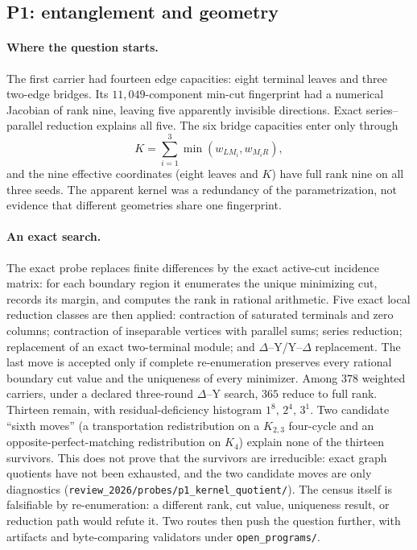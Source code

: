 \documentclass[11pt]{article}
\theoremstyle{definition}
\begin{document}
\subsection{P1: entanglement and geometry}\label{the-entanglement-geometry-question-open-program}

\paragraph{Where the question starts.} The first carrier had fourteen edge capacities: eight terminal leaves and three
two-edge bridges. Its \(11{,}049\)-component min-cut fingerprint had a numerical Jacobian of rank nine, leaving five
apparently invisible directions. Exact series--parallel reduction explains all five. The six bridge capacities enter
only through
\[
K=\sum_{i=1}^{3}\min(w_{LM_i},w_{M_iR}),
\]
and the nine effective coordinates (eight leaves and \(K\)) have full rank nine on all three seeds. The apparent kernel
was a redundancy of the parametrization, not evidence that different geometries share one fingerprint.

\paragraph{An exact search.} The exact probe replaces finite differences by the exact active-cut incidence matrix: for
each boundary region it enumerates the unique minimizing cut, records its margin, and computes the rank in rational
arithmetic. Five exact local reduction classes are then applied: contraction of saturated terminals and zero columns;
contraction of inseparable vertices with parallel sums; series reduction; replacement of an exact two-terminal module;
and \(\Delta\)--Y/Y--\(\Delta\) replacement. The last move is accepted only if complete re-enumeration preserves every
rational boundary cut value and the uniqueness of every minimizer. Among \(378\) weighted carriers, under a declared
three-round \(\Delta\)--Y search, \(365\) reduce to full rank. Thirteen remain, with residual-deficiency histogram
\(1^8,\,2^4,\,3^1\). Two candidate ``sixth moves'' (a transportation redistribution on a \(K_{2,3}\) four-cycle and an
opposite-perfect-matching redistribution on \(K_4\)) explain none of the thirteen survivors. This does not prove that
the survivors are irreducible: exact graph quotients have not been exhausted, and the two candidate moves are only
diagnostics (\nolinkurl{review_2026/probes/p1_kernel_quotient/}). The census itself is falsifiable by re-enumeration:
a different rank, cut value, uniqueness result, or reduction path would refute it. Two routes then push the question
further, with artifacts and byte-comparing validators under \nolinkurl{open_programs/}.
\end{document}
